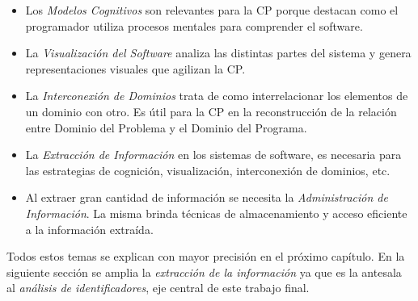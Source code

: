 \begin{itemize}

\item Los \textit{Modelos Cognitivos} son relevantes para la CP porque destacan como el programador utiliza procesos mentales para comprender el software.

\item La \textit{Visualización del Software} analiza las distintas partes del sistema y genera representaciones visuales que agilizan la CP.

\item La \textit{Interconexión de Dominios} trata de como interrelacionar los elementos de un dominio con otro. Es útil para la CP en la reconstrucción de la relación entre Dominio del Problema y el Dominio del Programa.

\item La \textit{Extracción de Información} en los sistemas de software, es necesaria para las estrategias de cognición, visualización, interconexión de dominios, etc.

\item Al extraer gran cantidad de información se necesita la \textit{Administración de Información}. La misma brinda técnicas de almacenamiento y acceso eficiente a la información extraída.

\end{itemize}

Todos estos temas se explican con mayor precisión en el próximo capítulo. En la siguiente sección se amplia la \textit{extracción de la información} ya que es la antesala al \textit{análisis de identificadores}, eje central de este trabajo final.




